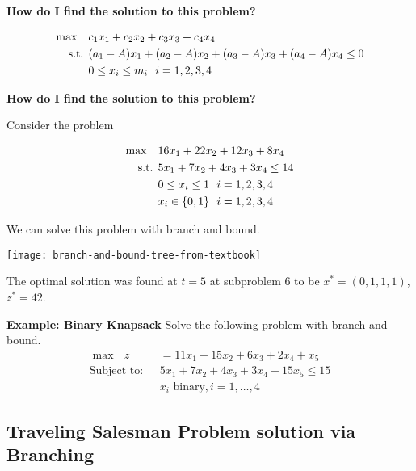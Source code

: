 \documentclass[../open-optimization/open-optimization.tex]{subfiles}
\begin{document}
\textbf{How do I find the solution to this problem?}

\newpage

\begin{align*}
\max \quad & c_1 x_1 + c_2 x_2 + c_3 x_3 + c_4 x_4\\
\text{ s.t. } & (a_1 - A)x_1 + (a_2-A) x_2 + (a_3-A) x_3 + (a_4-A) x_4 \leq 0\\
& 0 \leq x_i \leq m_i \ \ i=1,2,3,4\\
\end{align*}

\textbf{How do I find the solution to this problem?}

\newpage


Consider the problem 

\begin{align*}
\max \quad & 16x_1 + 22x_2 + 12x_3 + 8 x_4\\
\text{ s.t. } & 5x_1 + 7x_2 + 4x_3 + 3x_4 \leq 14\\
& 0 \leq x_i \leq 1 \ \ i=1,2,3,4\\
& x_i \in \{0,1\} \ \ i=1,2,3,4
\end{align*}

We can solve this problem with branch and bound.
\newpage

\newpage

\newpage

\begin{center}
\texttt{[image: branch-and-bound-tree-from-textbook]}
\end{center}

The optimal solution was found at $t=5$ at subproblem 6 to be $x^* = (0,1,1,1)$, $z^* = 42$.



\textbf{Example: Binary Knapsack}
Solve the following problem with branch and bound.
\begin{align*}
\max\ \ \   z&=11x_1+15x_2+6x_3+2x_4 + x_5\\
\text{Subject to:} \ \ \ 	 &5x_1+7x_2+4x_3+3x_4 + 15x_5\leq15\\
		&x_i  \text{  binary},i=1,\dots,4
\end{align*}




\subsection{Traveling Salesman Problem solution via Branching}
\end{document}
